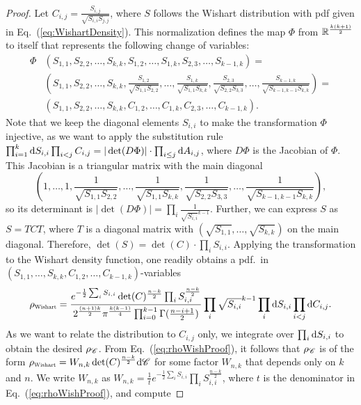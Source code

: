 \begin{proof}
	Let $C_{i,j} = \frac{S_{i,j}}{\sqrt{S_{i,i} S_{j,j}}}$, where $S$ follows the Wishart distribution with pdf given in Eq.~(\ref{eq:WishartDensity}). This normalization defines the map $\Phi$ from ${{\mathbb R}}^{\frac{k(k+1)}{2}}$ to itself that represents the following change of variables:
	\begin{align*}
		\Phi&(S_{1,1}, S_{2,2}, \ldots, S_{k,k}, S_{1,2}, \ldots, S_{1,k}, S_{2,3}, \ldots, S_{k-1, k}) = \\
		&(S_{1,1}, S_{2,2}, \ldots, S_{k,k}, \tfrac{S_{1,2}}{\sqrt{S_{1,1} S_{2,2}}}, \ldots, \tfrac{S_{1,k}}{\sqrt{S_{1,1} S_{k,k}}}, \tfrac{S_{2,3}}{\sqrt{S_{2,2} S_{3,3}}}, \ldots, \tfrac{S_{k-1,k}}{\sqrt{S_{k-1,k-1} S_{k,k}}}) = \\
		&(S_{1,1}, S_{2,2}, \ldots, S_{k,k}, C_{1,2}, \ldots, C_{1, k}, C_{2,3}, \ldots, C_{k-1, k}).
	\end{align*}
	Note that we keep the diagonal elements $S_{i,i}$ to make the transformation $\Phi$ injective, as we want to apply the substitution rule $\prod_{i=1}^k \mathrm{d} S_{i,i} \prod_{i <j} C_{i,j} = | \det (D \Phi) | \cdot \prod_{i \leq j} \mathrm{d} A_{i,j}$, where $D \Phi$ is the Jacobian of $\Phi$. This Jacobian is a triangular matrix with the main diagonal 
	\[(1, \ldots, 1, \frac{1}{\sqrt{S_{1,1} S_{2,2}}}, \ldots, \frac{1}{\sqrt{S_{1,1} S_{k,k}}}, \frac{1}{\sqrt{S_{2,2} S_{3,3}}}, \ldots, \frac{1}{\sqrt{S_{k-1,k-1} S_{k,k}}}),  
	\]
	so its determinant is $|\det (D \Phi)|  = \prod_i \frac{1}{\sqrt{S_{i,i}}^{k-1}}$.
	Further, we can express $S$ as $S = T C T$, where $T$ is a diagonal matrix with $(\sqrt{S_{1,1}}, \ldots, \sqrt{S_{k,k}})$ on the main diagonal. Therefore, $\det(S) = \det(C) \cdot \prod_i S_{i,i}$. Applying the transformation to the Wishart density function, one readily obtains a pdf.\ in $(S_{1,1}, \ldots, S_{k,k}, C_{1,2}, \ldots, C_{k-1,k})$-variables
	\begin{equation} \label{eq:rhoWishProof}
		\pW = \frac{ e^{-\frac12\sum_i S_{i,i}} \det(C)^{\frac{n-k}{2}} \prod_i S_{i,i}^{\frac{n-k}{2}}}{2^{\frac{(n+1)k}{2}} \pi^{\frac{k(k-1)}{4}} \prod_{i=0}^{k-1} \Gamma(\frac{n-i+1}{2} ) } \prod_i\sqrt{S_{i,i}}^{k-1}\prod_i \d S_{i,i}\prod_{i<j}\d C_{i,j}.
	\end{equation}
	As we want to relate the distribution to $C_{i,j}$ only, we integrate over $\prod_i \mathrm{d} S_{i,i}$ to obtain the desired $\rho_{\mathscr{C}}$. From Eq.~(\ref{eq:rhoWishProof}), it follows that $\rho_{\mathscr{C}}$ is of the form $\pW = W_{n,k} \det(C)^{\frac{n-k}{2}} \d \ConfSpace$ for some factor $W_{n,k}$ that depends only on $k$ and $n$. We write $W_{n,k}$ as $W_{n,k} = \frac{1}{t} e^{-\frac12\sum_i S_{i,i}} \prod_i S_{i,i}^{\frac{n-k}{2}}$, where $t$ is the denominator in Eq.~(\ref{eq:rhoWishProof}), and compute

\end{proof}
